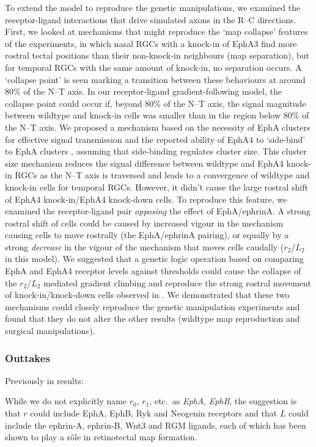 \documentclass[9pt,lineno,draft]{elife}
\begin{document}
To extend the model to reproduce the genetic manipulations, we examined the receptor-ligand interactions that drive simulated axons in the R--C directions.
First, we looked at mechanisms that might reproduce the `map collapse' features of the experiments, in which nasal RGCs with a knock-in of EphA3 find more rostral tectal positions than their non-knock-in neighbours (map separation), but for temporal RGCs with the same amount of knock-in, no separation occurs.
A `collapse point' is seen marking a transition between these behaviours at around 80\% of the N--T axis.
In our receptor-ligand gradient-following model, the collapse point could occur if, beyond 80\% of the N--T axis, the signal magnitude between wildtype and knock-in cells was smaller than in the region below 80\% of the N--T axis.
We proposed a mechanism based on the necessity of EphA clusters for effective signal transmission and the reported ability of EphA4 to `side-bind' to EphA clusters \citep{nikolov_ephephrin_2013}, assuming that side-binding regulates cluster size.
This cluster size mechanism reduces the signal difference between wildtype and EphA4 knock-in RGCs as the N--T axis is traversed and leads to a convergence of wildtype and knock-in cells for temporal RGCs.
However, it didn't cause the large rostral shift of EphA4 knock-in/EphA4 knock-down cells. To reproduce this feature, we examined the receptor-ligand pair \emph{opposing} the effect of EphA/ephrinA.
A strong rostral shift of cells could be caused by increased vigour in the mechanism causing cells to move rostrally (the EphA/ephrinA pairing), or equally by a strong \emph{decrease} in the vigour of the mechanism that moves cells caudally ($r_2$/$L_2$ in this model).
We suggested that a genetic logic operation based on comparing EphA and EphA4 receptor levels against thresholds could cause the collapse of the $r_2$/$L_2$ mediated gradient climbing and reproduce the strong rostral movement of knock-in/knock-down cells observed in \citet{reber_relative_2004}.
We demonstrated that these two mechanisms could closely reproduce the genetic manipulation experiments and found that they do not alter the other results (wildtype map reproduction and surgical manipulations).

\subsubsection*{Outtakes}

Previously in results:

While we do not explicitly name $r_0$, $r_1$, etc.~as \emph{EphA}, \emph{EphB}, the suggestion is that $r$ could include EphA, EphB, Ryk \citep{schmitt_wntryk_2006} and Neogenin \citep{rajagopalan_neogenin_2004} receptors and that $L$ could include the ephrin-A, ephrin-B, Wnt3 \citep{schmitt_wntryk_2006} and RGM \citep{monnier_rgm_2002} ligands, each of which has been shown to play a r\^ole in retinotectal map formation.
\end{document}
